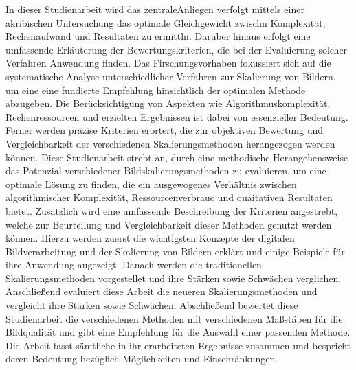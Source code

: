     In dieser Studienarbeit wird das zentraleAnliegen verfolgt mittels einer akribischen Untersuchung das optimale Gleichgewicht zwischn Komplexität, Rechenaufwand und Resultaten zu ermittln. 
    Darüber hinaus erfolgt eine umfassende Erläuterung der Bewertungskriterien, die bei der Evaluierung solcher Verfahren Anwendung finden. 
    Das Firschungsvorhaben fokussiert sich auf die systematische Analyse unterschiedlicher Verfahren zur Skalierung von Bildern, um eine eine fundierte Empfehlung hinsichtlich der optimalen Methode abzugeben. 
    Die Berücksichtigung von Aspekten wie Algorithmuskomplexität, Rechenressourcen und erzielten Ergebnissen ist dabei von essenzieller Bedeutung. 
    Ferner werden präzise Kriterien erörtert, die zur objektiven Bewertung und Vergleichbarkeit der verschiedenen Skalierungsmethoden herangezogen werden können.
    Diese Studienarbeit strebt an, durch eine methodische Herangehensweise das Potenzial verschiedener Bildskalierungsmethoden zu evaluieren, um eine optimale Lösung zu finden, die ein ausgewogenes Verhältnis zwischen algorithmischer Komplexität, Ressourcenverbrauc und quaitativen Resultaten bietet. 
    Zusätzlich wird eine umfassende Beschreibung der Kriterien angestrebt, welche zur Beurteilung und Vergleichbarkeit dieser Methoden genutzt werden können.
    Hierzu werden zuerst die wichtigsten Konzepte der digitalen Bildverarbeitung und der Skalierung von Bildern erklärt und einige Beispiele für ihre Anwendung augezeigt. 
    Danach werden die traditionellen Skalierungsmethoden vorgestellet und  ihre Stärken sowie Schwächen verglichen. 
    Anschließend evaluiert diese Arbeit die neueren Skalierungsmethoden und vergleicht ihre Stärken sowie Schwächen. 
    Abschließend bewertet diese Studienarbeit die verschiedenen Methoden mit verschiedenen Maßstäben für die Bildqualität und gibt eine Empfehlung für die Auswahl einer passenden Methode. 
    Die Arbeit fasst sämtliche in ihr erarbeiteten Ergebnisse zusammen und bespricht deren Bedeutung bezüglich Möglichkeiten und Einschränkungen.
    \newpage
